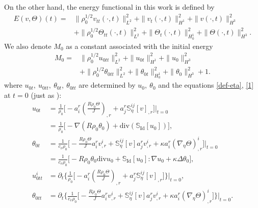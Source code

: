 \documentclass[12pt,a4paper]{amsart}
\numberwithin{equation}{section}
\theoremstyle{plain}
\theoremstyle{definition}
\newcommand{\dv}{\mathrm{div}}
\begin{document}
On the other hand, the energy functional in this work is defined by
\begin{equation}\label{E}
\begin{aligned}
E(v,\Theta)(t)=&\|\rho_0^{1/2}v_{tt}(\cdot,t)\|_{L^2}^2+\|v_t(\cdot,t)\|_{H^1}^2+\|v(\cdot,t)\|_{H^3}^2\\
&+\|\rho_0^{1/2}\Theta_{tt}(\cdot,t)\|_{L^2}^2+\|\Theta_t(\cdot,t)\|_{H_0^1}^2+\|\Theta(\cdot,t)\|_{H^3}^2.
\end{aligned}
\end{equation}
We also denote $M_0$ as a constant associated with the initial energy 
\begin{equation}\label{M_0}
   \begin{aligned}
    M_0=&\|\rho_0^{1/2}u_{0tt}\|_{L^2}^2+\|u_{0t}\|_{H^1}^2+\|u_0\|_{H^3}^2\\
	&+\|\rho_0^{1/2}\theta_{0tt}\|_{L^2}^2+\|\theta_{0t}\|_{H_0^1}^2+\|\theta_0\|_{H^3}^2+1.
	\end{aligned}
\end{equation}
where $u_{0t},~u_{0tt},~\theta_{0t},~\theta_{0tt}$ are determined by $u_0,~\theta_0$ and the equations \eqref{def-eta}, \eqref{1} at $t=0$ (just as \cite{Coutand2011, Gu2015}):
\begin{align*}
	u_{0t}&=\frac{1}{\rho_{0}}\big[- a^r_i (\frac{R\rho_0 \Theta}{J})_{,r} + a^r_j \mathbb{S}^{ij}_{\eta}[v]_{,r}\big]\Big|_{t=0}\\
	&=\frac{1}{\rho_0}\big[-\nabla (R\rho_0 \theta_0)+\dv (\mathbb{S}_{\text{Id}}[u_0])\big],\\
    \theta_{0t}&=\frac{1}{c_v\rho_{0}}\big[-\frac{R\rho_0\Theta}{J}a^r_iv^i_{,r}+  \mathbb{S}^{ij}_{\eta}[v]a^r_jv^i_{,r}+\kappa a^r_i(\nabla_{\eta}\Theta)^i_{,r}\big]\Big|_{t=0}\\
	&=\frac{1}{c_v\rho_0}\big[-R\rho_0\theta_0\dv u_0+\mathbb{S}_{\text{Id}}[u_0]:\nabla u_0 +\kappa \Delta \theta_0\big],\\
	u^i_{0tt}&=\partial_t \big\{\frac{1}{\rho_{0}}\big[- a^r_i (\frac{R\rho_0 \Theta}{J})_{,r} + a^r_j \mathbb{S}^{ij}_{\eta}[v]_{,r}\big]\big\} \Big|_{t=0},\\
	\theta_{0tt}&=\partial_t \big\{\frac{1}{c_v\rho_{0}}\big[-\frac{R\rho_0\Theta}{J}a^r_iv^i_{,r}+  \mathbb{S}^{ij}_{\eta}[v]a^r_jv^i_{,r}+\kappa a^r_i(\nabla_{\eta}\Theta)^i_{,r}\big]\big\} \Big|_{t=0}.
\end{align*}
\end{document}

